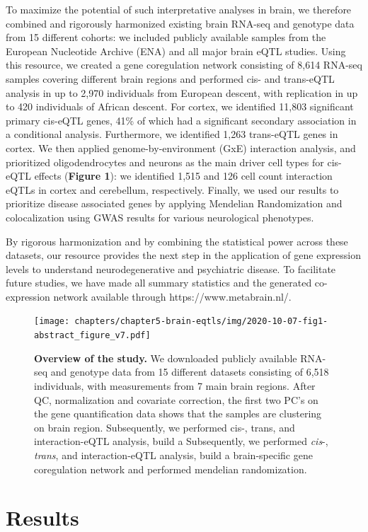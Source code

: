 To maximize the potential of such interpretative analyses in brain, we therefore combined and rigorously harmonized existing brain RNA-seq and genotype data from 15 different cohorts: we included publicly available samples from the European Nucleotide Archive (ENA) and all major brain eQTL studies. Using this resource, we created a gene coregulation network consisting of 8,614 RNA-seq samples covering different brain regions and performed cis- and trans-eQTL analysis in up to 2,970 individuals from European descent, with replication in up to 420 individuals of African descent. For cortex, we identified 11,803 significant primary cis-eQTL genes, 41\% of which had a significant secondary association in a conditional analysis. Furthermore, we identified 1,263 trans-eQTL genes in cortex. We then applied genome-by-environment (GxE) interaction analysis, and prioritized oligodendrocytes and neurons as the main driver cell types for cis-eQTL effects (\textbf{Figure 1}): we identified 1,515 and 126 cell count interaction eQTLs in cortex and cerebellum, respectively. Finally, we used our results to prioritize disease associated genes by applying Mendelian Randomization and colocalization using GWAS results for various neurological phenotypes.  

By rigorous harmonization and by combining the statistical power across these datasets, our resource provides the next step in the application of gene expression levels to understand neurodegenerative and psychiatric disease. To facilitate future studies, we have made all summary statistics and the generated co-expression network available through https://www.metabrain.nl/. 

\begin{figure}[h!]
	\texttt{[image: chapters/chapter5-brain-eqtls/img/2020-10-07-fig1-abstract\_figure\_v7.pdf]}
	\caption{\textbf{Overview of the study.} We downloaded publicly available RNA-seq and genotype data from 15 different datasets consisting of 6,518 individuals, with measurements from 7 main brain regions.  After QC, normalization and covariate correction, the first two PC’s on the gene quantification data shows that the samples are clustering on brain region. Subsequently, we performed cis-, trans, and interaction-eQTL analysis, build a Subsequently, we performed \emph{cis}-, \emph{trans}, and interaction-eQTL analysis, build a brain-specific gene coregulation network and performed mendelian randomization.}
\end{figure}


\section{Results}
